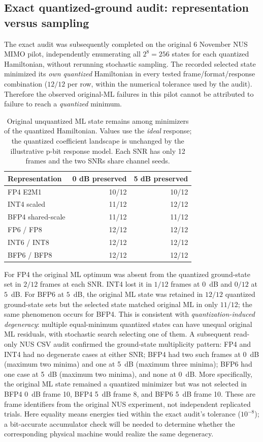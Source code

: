 \documentclass[11pt,a4paper]{article}
\begin{document}
\subsection{Exact quantized-ground audit: representation versus sampling}
The exact audit was subsequently completed on the original 6 November
NUS MIMO pilot, independently enumerating all $2^8=256$ states
for each quantized Hamiltonian, without rerunning stochastic sampling.
The recorded selected state minimized its \emph{own quantized}
Hamiltonian in every tested frame/format/response combination
($12/12$ per row, within the numerical tolerance used by the audit).
Therefore the observed original-ML failures in this pilot cannot be
attributed to failure to reach a \emph{quantized} minimum.

\begin{table}[htbp]
\centering\small
\begin{tabular}{@{}lrr@{}}\toprule
Representation & 0 dB preserved & 5 dB preserved\\\midrule
FP4 E2M1 & 10/12 & 10/12\\
INT4 scaled & 11/12 & 12/12\\
BFP4 shared-scale & 11/12 & 11/12\\
FP6 / FP8 & 12/12 & 12/12\\
INT6 / INT8 & 12/12 & 12/12\\
BFP6 / BFP8 & 12/12 & 12/12\\\bottomrule
\end{tabular}
\caption{Original unquantized ML state remains among minimizers of
the quantized Hamiltonian. Values use the \emph{ideal} response;
the quantized coefficient landscape is unchanged by the illustrative
p-bit response model. Each SNR has only 12 frames and the two SNRs
share channel seeds.}
\label{tab:m1ground}
\end{table}

For FP4 the original ML optimum was absent from the quantized
ground-state set in $2/12$ frames at each SNR. INT4 lost it
in $1/12$ frames at $0$~dB and $0/12$ at $5$~dB.
For BFP6 at $5$~dB, the original ML state was retained
in $12/12$ quantized ground-state sets but the selected state
matched original ML in only $11/12$; the same phenomenon
occurs for BFP4. This is consistent with \emph{quantization-induced
degeneracy}: multiple equal-minimum quantized states can have unequal
original ML residuals, with stochastic search selecting one of them.
A subsequent read-only NUS CSV audit confirmed the ground-state
multiplicity pattern: FP4 and INT4 had no degenerate cases at either
SNR; BFP4 had two such frames at 0~dB (maximum two minima)
and one at 5~dB (maximum three minima); BFP6 had one case at
5~dB (maximum two minima), and none at 0~dB.
More specifically, the original ML state remained a quantized minimizer
but was not selected in BFP4 0~dB frame 10, BFP4 5~dB frame 8,
and BFP6 5~dB frame 10. These are frame identifiers from the
original NUS experiment, not independent replicated trials.
Here equality means energies tied within the exact audit's
tolerance ($10^{-8}$); a bit-accurate accumulator check will be
needed to determine whether the corresponding physical machine
would realize the same degeneracy.
\end{document}
